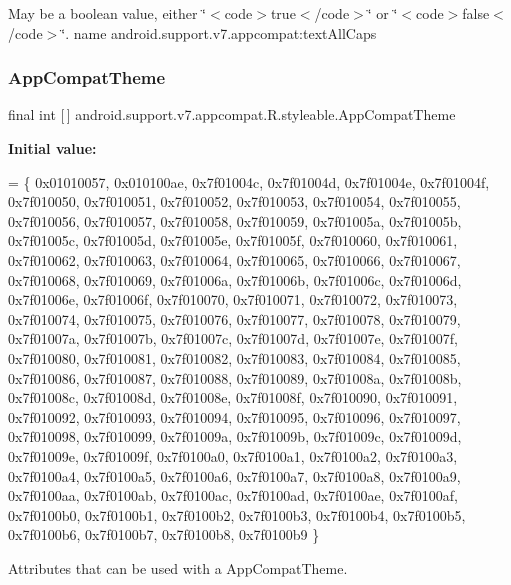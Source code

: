 May be a boolean value, either \char`\"{}$<$code$>$true$<$/code$>$\char`\"{} or \char`\"{}$<$code$>$false$<$/code$>$\char`\"{}.  name android.\+support.\+v7.\+appcompat\+:text\+All\+Caps \mbox{\label{classandroid_1_1support_1_1v7_1_1appcompat_1_1R_1_1styleable_a5c42f89e8a410c323be34208d75c430b}} 
\subsubsection{\texorpdfstring{App\+Compat\+Theme}{AppCompatTheme}}
{\footnotesize\ttfamily final int \mbox{[}$\,$\mbox{]} android.\+support.\+v7.\+appcompat.\+R.\+styleable.\+App\+Compat\+Theme\hspace{0.3cm}{\ttfamily [static]}}

{\bfseries Initial value\+:}
\begin{DoxyCode}
= \{
            0x01010057, 0x010100ae, 0x7f01004c, 0x7f01004d,
            0x7f01004e, 0x7f01004f, 0x7f010050, 0x7f010051,
            0x7f010052, 0x7f010053, 0x7f010054, 0x7f010055,
            0x7f010056, 0x7f010057, 0x7f010058, 0x7f010059,
            0x7f01005a, 0x7f01005b, 0x7f01005c, 0x7f01005d,
            0x7f01005e, 0x7f01005f, 0x7f010060, 0x7f010061,
            0x7f010062, 0x7f010063, 0x7f010064, 0x7f010065,
            0x7f010066, 0x7f010067, 0x7f010068, 0x7f010069,
            0x7f01006a, 0x7f01006b, 0x7f01006c, 0x7f01006d,
            0x7f01006e, 0x7f01006f, 0x7f010070, 0x7f010071,
            0x7f010072, 0x7f010073, 0x7f010074, 0x7f010075,
            0x7f010076, 0x7f010077, 0x7f010078, 0x7f010079,
            0x7f01007a, 0x7f01007b, 0x7f01007c, 0x7f01007d,
            0x7f01007e, 0x7f01007f, 0x7f010080, 0x7f010081,
            0x7f010082, 0x7f010083, 0x7f010084, 0x7f010085,
            0x7f010086, 0x7f010087, 0x7f010088, 0x7f010089,
            0x7f01008a, 0x7f01008b, 0x7f01008c, 0x7f01008d,
            0x7f01008e, 0x7f01008f, 0x7f010090, 0x7f010091,
            0x7f010092, 0x7f010093, 0x7f010094, 0x7f010095,
            0x7f010096, 0x7f010097, 0x7f010098, 0x7f010099,
            0x7f01009a, 0x7f01009b, 0x7f01009c, 0x7f01009d,
            0x7f01009e, 0x7f01009f, 0x7f0100a0, 0x7f0100a1,
            0x7f0100a2, 0x7f0100a3, 0x7f0100a4, 0x7f0100a5,
            0x7f0100a6, 0x7f0100a7, 0x7f0100a8, 0x7f0100a9,
            0x7f0100aa, 0x7f0100ab, 0x7f0100ac, 0x7f0100ad,
            0x7f0100ae, 0x7f0100af, 0x7f0100b0, 0x7f0100b1,
            0x7f0100b2, 0x7f0100b3, 0x7f0100b4, 0x7f0100b5,
            0x7f0100b6, 0x7f0100b7, 0x7f0100b8, 0x7f0100b9
        \}
\end{DoxyCode}
Attributes that can be used with a App\+Compat\+Theme. 

